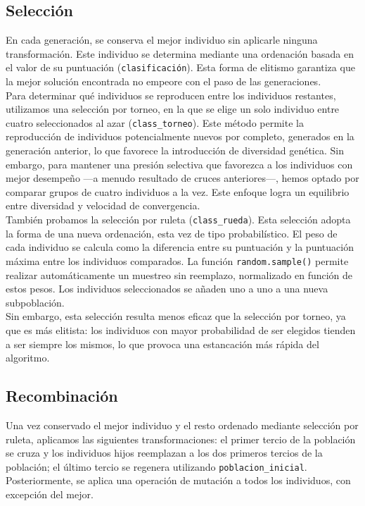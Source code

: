 \documentclass[12pt,a4paper]{report}
\begin{document}
\subsection{Selección}

En cada generación, se conserva el mejor individuo sin aplicarle ninguna transformación. Este individuo se determina mediante una ordenación basada en el valor de su puntuación (\texttt{clasificación}). Esta forma de elitismo garantiza que la mejor solución encontrada no empeore con el paso de las generaciones.\\

Para determinar qué individuos se reproducen entre los individuos restantes, utilizamos una selección por torneo, en la que se elige un solo individuo entre cuatro seleccionados al azar (\texttt{class\_torneo}). Este método permite la reproducción de individuos potencialmente nuevos por completo, generados en la generación anterior, lo que favorece la introducción de diversidad genética. Sin embargo, para mantener una presión selectiva que favorezca a los individuos con mejor desempeño —a menudo resultado de cruces anteriores—, hemos optado por comparar grupos de cuatro individuos a la vez.  Este enfoque logra un equilibrio entre diversidad y velocidad de convergencia.\\

También probamos la selección por ruleta (\texttt{class\_rueda}). Esta selección adopta la forma de una nueva ordenación, esta vez de tipo probabilístico. El peso de cada individuo se calcula como la diferencia entre su puntuación y la puntuación máxima entre los individuos comparados. La función \texttt{random.sample()} permite realizar automáticamente un muestreo sin reemplazo, normalizado en función de estos pesos. Los individuos seleccionados se añaden uno a uno a una nueva subpoblación.\\
Sin embargo, esta selección resulta menos eficaz que la selección por torneo, ya que es más elitista: los individuos con mayor probabilidad de ser elegidos tienden a ser siempre los mismos, lo que provoca una estancación más rápida del algoritmo.


\subsection{Recombinación}

Una vez conservado el mejor individuo y el resto ordenado mediante selección por ruleta, aplicamos las siguientes transformaciones: el primer tercio de la población se cruza y los individuos hijos reemplazan a los dos primeros tercios de la población; el último tercio se regenera utilizando \texttt{poblacion\_inicial}.
Posteriormente, se aplica una operación de mutación a todos los individuos, con excepción del mejor.
\end{document}
